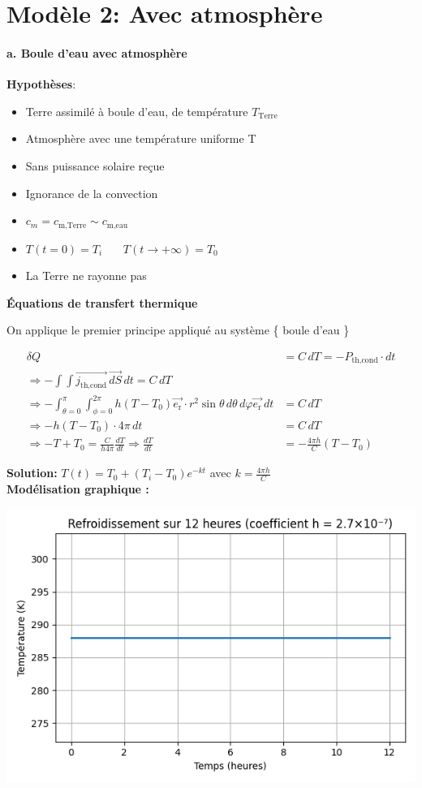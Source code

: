 \documentclass[a4paper,12pt]{article}
\begin{document}
\part{Modèle 2: Avec atmosphère}
\subsection{a. Boule d'eau avec atmosphère }
\textbf{Hypothèses}:
\begin{itemize}
    \item Terre assimilé à boule d'eau, de température \(T_{\text{Terre}}\) 
    \item  Atmosphère avec une température uniforme T 
    \item  Sans puissance solaire reçue  
    \item  Ignorance de la convection  
    \item \(c_m=c_{\text{m,Terre}}\sim c_{\text{m,eau}}\) 
    \item $T(t=0) = T_i$ \ \ \
$T(t \to +\infty) = T_0$
    \item La Terre ne rayonne pas
   
\end{itemize}
\textbf{Équations de transfert thermique}

On applique le premier principe appliqué au système \{ boule d'eau  \}

\begin{align*}
\delta Q &= C\, dT = -P_{\text{th,cond}} \cdot dt \\
\Rightarrow -\int \int \vec{j_{\text{th,cond}}}\, \vec{dS}\,dt = C\, dT \\
\Rightarrow -\int_{\theta=0}^\pi \int_{\phi=0}^{2\pi} h(T - T_0) \vec{e_{\text{r}}}\cdot r^2 \sin\theta\, d\theta\, d\varphi \vec{e_{\text{r}}}\, dt &=  C\, dT  \\
\Rightarrow -h(T - T_0) \cdot 4\pi\, dt &= C\, dT \\
\Rightarrow -T + T_0 = \frac{C}{h 4\pi} \frac{dT}{dt} \Rightarrow \frac{dT}{dt} &= -\frac{4\pi h}{C}(T - T_0)
\end{align*}

\vspace{0.5cm}

\textbf{Solution:} 
$T(t) = T_0 + (T_i - T_0)e^{-kt}$ \quad avec $k = \frac{4\pi h}{C}$
\\
\bigskip
\textbf{Modélisation graphique :} 
    
    \includegraphics[width=0.8\linewidth]{../modele2/figures/modele2.png}
\\
\end{document}
